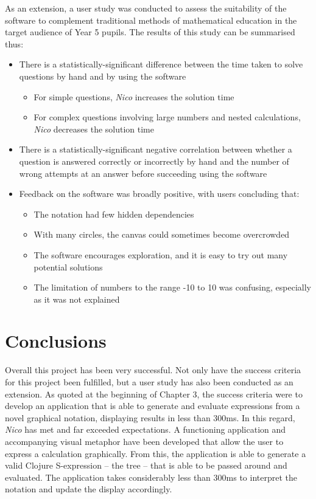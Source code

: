 \documentclass[12pt,twoside,notitlepage,xetex]{report}
\begin{document}
As an extension, a user study was conducted to assess the suitability of the software to complement traditional methods of mathematical education in the target audience of Year 5 pupils.  The results of this study can be summarised thus:
\begin{itemize}
\item There is a statistically-significant difference between the time taken to solve questions by hand and by using the software
\begin{itemize}
\item For simple questions, \emph{Nico} increases the solution time
\item For complex questions involving large numbers and nested calculations, \emph{Nico} decreases the solution time
\end{itemize}
\item There is a statistically-significant negative correlation between whether a question is answered correctly or incorrectly by hand and the number of wrong attempts at an answer before succeeding using the software
\item Feedback on the software was broadly positive, with users concluding that:
\begin{itemize}
\item The notation had few hidden dependencies
\item With many circles, the canvas could sometimes become overcrowded
\item The software encourages exploration, and it is easy to try out many potential solutions
\item The limitation of numbers to the range -10 to 10 was confusing, especially as it was not explained
\end{itemize}
\end{itemize}

\cleardoublepage
\chapter{Conclusions}

Overall this project has been very successful.  Not only have the success criteria for this project been fulfilled, but a user study has also been conducted as an extension.  As quoted at the beginning of Chapter 3, the success criteria were to develop an application that is able to generate and evaluate expressions from a novel graphical notation, displaying results in less than 300ms.  In this regard, \emph{Nico} has met and far exceeded expectations.  A functioning application and accompanying visual metaphor have been developed that allow the user to express a calculation graphically.  From this, the application is able to generate a valid Clojure S-expression -- the tree -- that is able to be passed around and evaluated.  The application takes considerably less than 300ms to interpret the notation and update the display accordingly.
\end{document}
